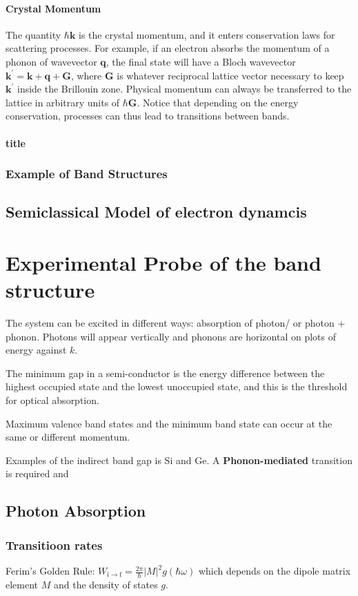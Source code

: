 \documentclass[12pt,a4paper]{article}
\begin{document}
\paragraph*{Crystal Momentum}
The quantity $\hbar \boldsymbol{k}$ is the crystal momentum, and it enters conservation laws for scattering processes. For example, if an electron absorbs the momentum of a phonon of wavevector $\boldsymbol{q}$, the final state will have a Bloch wavevector $\boldsymbol{k}^{\prime}=\boldsymbol{k}+\boldsymbol{q}+\boldsymbol{G}$, where $\boldsymbol{G}$ is whatever reciprocal lattice vector necessary to keep $\boldsymbol{k}^{\prime}$ inside the Brillouin zone. Physical momentum can always be transferred to the lattice in arbitrary units of $\hbar \boldsymbol{G}$. Notice that depending on the energy conservation, processes can thus lead to transitions between bands.
\paragraph*{title}

\subsubsection{Example of Band Structures}    
\subsection{Semiclassical Model of electron dynamcis}
\section{Experimental Probe of the band structure}
The system can be excited in different ways: absorption of photon/ or photon + phonon.
Photons will appear vertically and phonons are horizontal on plots of energy against $k$.

The minimum gap in a semi-conductor is the energy difference between the highest occupied state and the lowest unoccupied state, and this is the threshold for optical absorption.

Maximum valence band states and the minimum band state can occur at the same or different momentum.

Examples of the indirect band gap is Si and Ge. A \textbf{Phonon-mediated} transition is required and
\subsection{Photon Absorption}
\subsubsection{Transitioon rates}
Ferim's Golden Rule:
$W_{\mathrm{i} \rightarrow \mathrm{f}}=\frac{2 \pi}{\hbar}|M|^2 g(\hbar \omega)$
which depends on the dipole matrix element $M$ and the density of states $g$.
\end{document}
